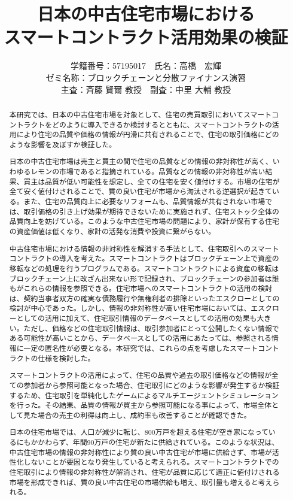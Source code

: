 \documentclass[a4paper,fontsize=11pt,report,notitlepage,line_length=38zw,number_of_lines=40,dvipdfmx]{jlreq}
\title{日本の中古住宅市場における\\スマートコントラクト活用効果の検証}
\author{
学籍番号：57195017　氏名：高橋　宏輝
\\ゼミ名称：ブロックチェーンと分散ファイナンス演習
\\主査：斉藤 賢爾 教授　副査：中里 大輔 教授}
\begin{document}
\date{}
\maketitle
\begin{abstract}
本研究では、日本の中古住宅市場を対象として、住宅の売買取引においてスマートコントラクトをどのように導入できるか検討するとともに、スマートコントラクトの活用により住宅の品質や価格の情報が円滑に共有されることで、住宅の取引価格にどのような影響を及ぼすか検証した。

日本の中古住宅市場は売主と買主の間で住宅の品質などの情報の非対称性が高く、いわゆるレモンの市場であると指摘されている。品質などの情報の非対称性が高い結果、買主は品質が低い可能性を想定し、全ての住宅を安く値付けする。市場の住宅が全て安く値付けされることで、質の良い住宅が市場から淘汰される逆選択が起きている。また、住宅の品質向上に必要なリフォームも、品質情報が共有されない市場では、取引価格の引き上げ効果が期待できないために実施されず、住宅ストック全体の品質向上を妨げている。このような中古住宅市場の問題により、家計が保有する住宅の資産価値は低くなり、家計の活発な消費や投資に繋がらない。

中古住宅市場における情報の非対称性を解消する手法として、住宅取引へのスマートコントラクトの導入を考えた。スマートコントラクトはブロックチェーン上で資産の移転などの処理を行うプログラムである。スマートコントラクトによる資産の移転はブロックチェーン上に改ざん出来ない形で記録され、ブロックチェーンの参加者は誰もがこれらの情報を参照できる。住宅市場へのスマートコントラクトの活用の検討は、契約当事者双方の確実な債務履行や無権利者の排除といったエスクローとしての検討が中心であった。しかし、情報の非対称性が高い住宅市場においては、エスクローとしての活用に加えて、住宅取引情報のデータベースとしての活用の効果も大きい。ただし、価格などの住宅取引情報は、取引参加者にとって公開したくない情報である可能性が高いことから、データベースとしての活用にあたっては、参照される情報に一定の匿名性が必要となる。本研究では、これらの点を考慮したスマートコントラクトの仕様を検討した。

スマートコントラクトの活用によって、住宅の品質や過去の取引価格などの情報が全ての参加者から参照可能となった場合、住宅取引にどのような影響が発生するか検証するため、住宅取引を単純化したゲームによるマルチエージェントシミュレーションを行った。その結果、品質の情報が買主から参照可能になる事によって、市場全体として見た場合の売主の利得は向上し、成約率も改善することが確認できた。

日本の住宅市場では、人口が減少に転じ、800万戸を超える住宅が空き家になっているにもかかわらず、年間90万戸の住宅が新たに供給されている。このような状況は、中古住宅市場の情報の非対称性により質の良い中古住宅が市場に供給さず、市場が活性化しないことが要因となり発生していると考えられる。スマートコントラクトでの住宅取引により情報の非対称性が解消され、住宅が品質に応じて適正に値付けされる市場を形成できれば、質の良い中古住宅の市場供給も増え、取引量も増えると考えられる。

\end{abstract}
\end{document}
